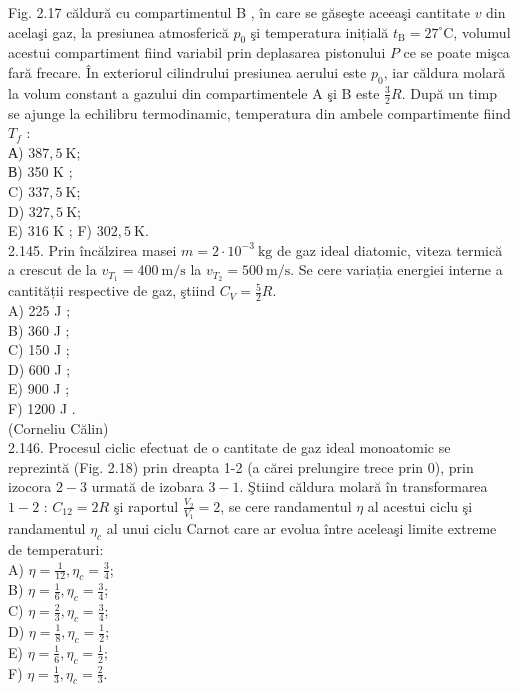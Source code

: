 \documentclass[10pt]{article}
\begin{document}
Fig. 2.17 căldură cu compartimentul B , în care se găseşte aceeaşi cantitate $v$ din acelaşi gaz, la presiunea atmosferică $p_{0}$ şi temperatura inițială $t_{\mathrm{B}}=27^{\circ} \mathrm{C}$, volumul acestui compartiment fiind variabil prin deplasarea pistonului $P$ ce se poate mişca fară frecare. În exteriorul cilindrului presiunea aerului este $p_{0}$, iar căldura molară la volum constant a gazului din compartimentele A şi B este $\frac{3}{2} R$. După un timp se ajunge la echilibru termodinamic, temperatura din ambele compartimente fiind $T_{f}$ :\\
А) $387,5 \mathrm{~K}$;\\
В) 350 K ;\\
C) $337,5 \mathrm{~K}$;\\
D) $327,5 \mathrm{~K}$;\\
E) 316 K ; F) $302,5 \mathrm{~K}$.\\
2.145. Prin încălzirea masei $m=2 \cdot 10^{-3} \mathrm{~kg}$ de gaz ideal diatomic, viteza termică a crescut de la $v_{T_{1}}=400 \mathrm{~m} / \mathrm{s}$ la $v_{T_{2}}=500 \mathrm{~m} / \mathrm{s}$. Se cere variația energiei interne a cantității respective de gaz, ştiind $C_{V}=\frac{5}{2} R$.\\
A) 225 J ;\\
B) 360 J ;\\
C) 150 J ;\\
D) 600 J ;\\
E) 900 J ;\\
F) 1200 J .\\
(Corneliu Călin)\\
2.146. Procesul ciclic efectuat de o cantitate de gaz ideal monoatomic se reprezintă (Fig. 2.18) prin dreapta 1-2 (a cărei prelungire trece prin 0), prin izocora $2-3$ urmată de izobara $3-1$. Ştiind căldura molară în transformarea $1-2$ : $C_{12}=2 R$ şi raportul $\frac{V_{2}}{V_{1}}=2$, se cere randamentul $\eta$ al acestui ciclu şi randamentul $\eta_{c}$ al unui ciclu Carnot care ar evolua între aceleaşi limite extreme de temperaturi:\\
A) $\eta=\frac{1}{12}, \eta_{c}=\frac{3}{4}$;\\
B) $\eta=\frac{1}{6}, \eta_{c}=\frac{3}{4}$;\\
C) $\eta=\frac{2}{3}, \eta_{c}=\frac{3}{4}$;\\
D) $\eta=\frac{1}{8}, \eta_{c}=\frac{1}{2}$;\\
E) $\eta=\frac{1}{6}, \eta_{c}=\frac{1}{2}$;\\
F) $\eta=\frac{1}{3}, \eta_{c}=\frac{2}{3}$.\\
\end{document}

